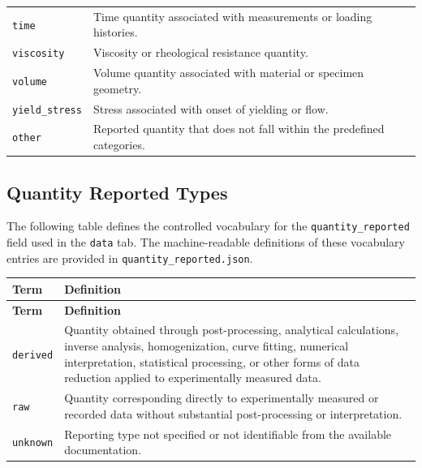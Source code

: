 \documentclass[11pt]{book}
\begin{document}
{\begin{longtable}{p{}p{}}
\texttt{time} &
Time quantity associated with measurements or loading histories. \\

\texttt{viscosity} &
Viscosity or rheological resistance quantity. \\

\texttt{volume} &
Volume quantity associated with material or specimen geometry. \\

\texttt{yield\_stress} &
Stress associated with onset of yielding or flow. \\

\texttt{other} &
Reported quantity that does not fall within the predefined categories. \\

\hline
\end{longtable}

\subsection{Quantity Reported Types}
\label{vocab:quantity_reported_type_list}

The following table defines the controlled vocabulary for the \texttt{quantity\_reported} field used in the \texttt{data} tab. The machine-readable definitions of these vocabulary entries are 
provided in \texttt{quantity\_reported.json}.

\begin{longtable}{p{}p{}}
\label{tab:quantity_reported_vocab}\\
\hline
\textbf{Term} & \textbf{Definition} \\
\hline
\endfirsthead

\hline
\textbf{Term} & \textbf{Definition} \\
\hline
\endhead

\texttt{derived} &
Quantity obtained through post-processing, analytical calculations, inverse analysis, homogenization, curve fitting, numerical interpretation, statistical processing, or other forms of data reduction applied to experimentally measured data. \\

\texttt{raw} &
Quantity corresponding directly to experimentally measured or recorded data without substantial post-processing or interpretation. \\

\texttt{unknown} &
Reporting type not specified or not identifiable from the available documentation. \\


\end{longtable}}
\end{document}
